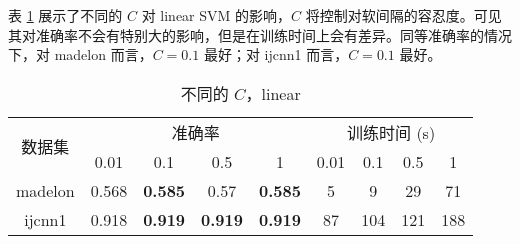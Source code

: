     表 \ref{tab:c} 展示了不同的 $C$ 对 linear SVM 的影响，$C$ 将控制对软间隔的容忍度。可见其对准确率不会有特别大的影响，但是在训练时间上会有差异。同等准确率的情况下，对 madelon 而言，$C=0.1$ 最好；对 ijcnn1 而言，$C=0.1$ 最好。

    \begin{table}[ht]
        \centering
        \caption{不同的 $C$，linear}\label{tab:c}
        \begin{tabular}{ccccccccc}
            \toprule
            \multirow{2}{*}{数据集} & \multicolumn{4}{c}{准确率} & \multicolumn{4}{c}{训练时间 (s)} \\
            \cmidrule(r){2-5}\cmidrule(l){6-9}
            & 0.01 & 0.1 & 0.5 & 1 & 0.01 & 0.1 & 0.5 & 1 \\
            \midrule
            madelon & 0.568 & \textbf{0.585} & 0.57 & \textbf{0.585} & 5 & 9  & 29 & 71 \\
            ijcnn1 & 0.918 & \textbf{0.919} & \textbf{0.919} & \textbf{0.919} & 87 & 104 & 121 & 188 \\
            \bottomrule
        \end{tabular}
    \end{table}

